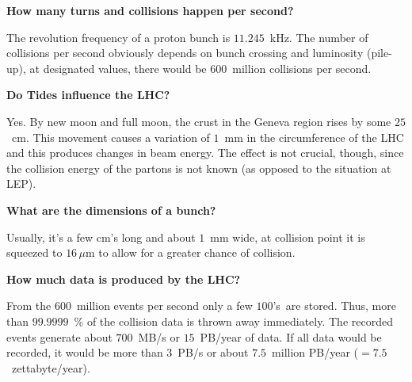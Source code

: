\documentclass{atlasnote}
\newenvironment{question} %
{\noindent\bfseries}
{\par}
\newenvironment{answer} %
{}
{\vspace*{10pt}}
\newenvironment{faq} %
{\par\noindent\begin{minipage}{\linewidth}}
    {\end{minipage}\par}
\begin{document}
\begin{faq}
    \begin{question}
        How many turns and collisions happen per second?
    \end{question}
    \begin{answer}
        The revolution frequency of a proton bunch is $11.245$~kHz. The number of collisions per second obviously depends on bunch crossing and luminosity
        (pile-up), at designated values, there would be $600$~million collisions per second. 
    \end{answer}
\end{faq}

\begin{faq}
    \begin{question}
        Do Tides influence the LHC?
    \end{question}
    \begin{answer}
        Yes. By new moon and full moon, the crust in the Geneva region rises by some $25$~cm. This movement causes a variation of $1$~mm in the circumference of
        the LHC and this produces changes in beam energy. The effect is not crucial, though, since the collision energy of the partons is not known (as opposed to
        the situation at LEP).
    \end{answer}
\end{faq}

\begin{faq}
    \begin{question}
        What are the dimensions of a bunch?
    \end{question}
    \begin{answer}
        Usually, it's a few cm's long and about $1$~mm wide, at collision point it is squeezed to $16 \, \mu$m to allow for a greater chance of collision.
    \end{answer}
\end{faq}

\begin{faq}
    \begin{question}
        How much data is produced by the LHC?
    \end{question}
    \begin{answer}
        From the $600$~million events per second only a few $100$'s~are stored. Thus, more than $99.9999$~\% of the collision data is thrown away
        immediately. The recorded
        events generate about $700$~MB/s or $15$~PB/year of data. If all data would be recorded, it would be more than $3$~PB/s or about $7.5$~million PB/year
        ($=7.5$~zettabyte/year).
    \end{answer}
\end{faq}
\end{document}
